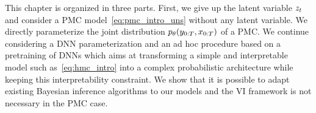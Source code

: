 





This chapter is organized in three parts.
First, we give up the latent variable $z_t$ and
consider a PMC model~\eqref{eq:pmc_intro_uns} 
without any latent variable.
We directly parameterize the joint distribution
$p_{\theta}(y_{0:T},x_{0:T})$ of a PMC.
We continue considering a DNN parameterization and 
an ad hoc procedure based on a pretraining of DNNs which aims at
transforming a simple and interpretable model such as~\eqref{eq:hmc_intro}
into a complex probabilistic architecture while keeping this interpretability constraint.
We show that it is possible to adapt existing  Bayesian inference algorithms
to our models and the VI framework is not necessary in the PMC case.


